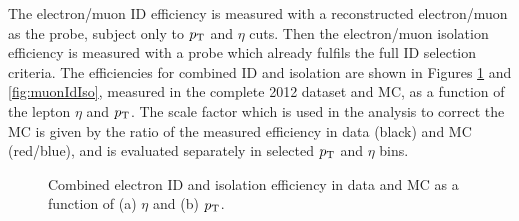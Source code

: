 The electron/muon ID efficiency is measured with a reconstructed
electron/muon as the probe, subject only to $\pt$ and $\eta$ cuts. 
Then the electron/muon isolation efficiency is measured
with a probe which already fulfils the full ID selection criteria. 
The efficiencies for combined ID and isolation are shown in Figures
\ref{fig:electronIdIso} and \ref{fig:muonIdIso}, measured in the complete 2012
dataset and \ac{MC}, as a function of the lepton $\eta$ and $\pt$.
The scale factor which is used in the analysis to correct the \ac{MC} is given by the ratio of the
measured efficiency in data (black) and \ac{MC} (red/blue), and is evaluated separately in
selected $\pt$ and $\eta$ bins.

\begin{figure}[htb]
\caption[Combined electron ID and isolation efficiency in data and MC as a
function of (a) $\eta$ and (b) $\pt$.]
{Combined electron ID and isolation efficiency in data and \ac{MC} as a
function of (a) $\eta$ and (b) $\pt$.}
\label{fig:electronIdIso}
\end{figure}

